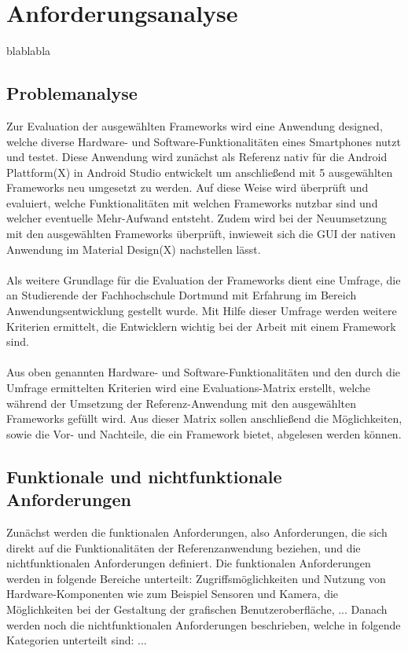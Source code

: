 \chapter{Anforderungsanalyse}

blablabla 

\section{Problemanalyse}

Zur Evaluation der ausgewählten Frameworks wird eine Anwendung designed, welche diverse Hardware- und Software-Funktionalitäten eines Smartphones nutzt und testet. Diese Anwendung wird zunächst als Referenz nativ für die Android Plattform(X) in Android Studio entwickelt um anschließend mit 5 ausgewählten Frameworks neu umgesetzt zu werden. Auf diese Weise wird überprüft und evaluiert, welche Funktionalitäten mit welchen Frameworks nutzbar sind und welcher eventuelle Mehr-Aufwand entsteht. Zudem wird bei der Neuumsetzung mit den ausgewählten Frameworks überprüft, inwieweit sich die GUI der nativen Anwendung im Material Design(X) nachstellen lässt. 
\\
\\
Als weitere Grundlage für die Evaluation der Frameworks dient eine Umfrage, die an Studierende der Fachhochschule Dortmund mit Erfahrung im Bereich Anwendungsentwicklung gestellt wurde. Mit Hilfe dieser Umfrage werden weitere Kriterien ermittelt, die Entwicklern wichtig bei der Arbeit mit einem Framework sind.
\\
\\
Aus oben genannten Hardware- und Software-Funktionalitäten und den durch die Umfrage ermittelten Kriterien wird eine Evaluations-Matrix erstellt, welche während der Umsetzung der Referenz-Anwendung mit den ausgewählten Frameworks gefüllt wird. Aus dieser Matrix sollen anschließend die Möglichkeiten, sowie die Vor- und Nachteile, die ein Framework bietet, abgelesen werden können.

\section{Funktionale und nichtfunktionale Anforderungen}

Zunächst werden die funktionalen Anforderungen, also Anforderungen, die sich direkt auf die Funktionalitäten der Referenzanwendung beziehen, und die nichtfunktionalen Anforderungen definiert. Die funktionalen Anforderungen werden in folgende Bereiche unterteilt: Zugriffsmöglichkeiten und Nutzung von Hardware-Komponenten wie zum Beispiel Sensoren und Kamera, die Möglichkeiten bei der Gestaltung der grafischen Benutzeroberfläche, ... Danach werden noch die nichtfunktionalen Anforderungen beschrieben, welche in folgende Kategorien unterteilt sind: ...

